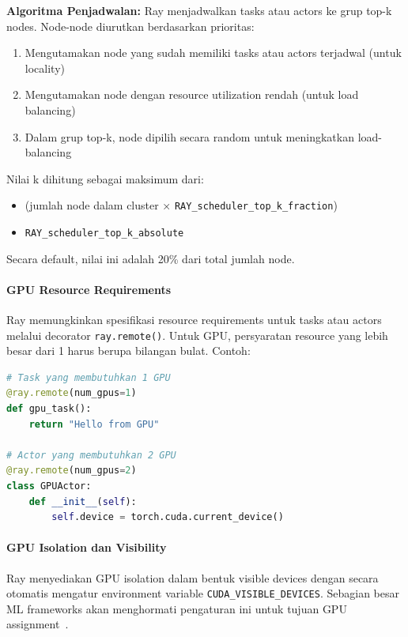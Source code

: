 \textbf{Algoritma Penjadwalan:}
Ray menjadwalkan tasks atau actors ke grup top-k nodes. Node-node diurutkan berdasarkan prioritas:
\begin{enumerate}
\item Mengutamakan node yang sudah memiliki tasks atau actors terjadwal (untuk locality)
\item Mengutamakan node dengan resource utilization rendah (untuk load balancing)
\item Dalam grup top-k, node dipilih secara random untuk meningkatkan load-balancing
\end{enumerate}

Nilai k dihitung sebagai maksimum dari:
\begin{itemize}
\item (jumlah node dalam cluster × \texttt{RAY\_scheduler\_top\_k\_fraction})
\item \texttt{RAY\_scheduler\_top\_k\_absolute}
\end{itemize}
Secara default, nilai ini adalah 20\% dari total jumlah node.

\paragraph{GPU Resource Requirements}

Ray memungkinkan spesifikasi resource requirements untuk tasks atau actors melalui decorator \texttt{ray.remote()}. Untuk GPU, persyaratan resource yang lebih besar dari 1 harus berupa bilangan bulat. Contoh:

\begin{lstlisting}[language=Python]
# Task yang membutuhkan 1 GPU
@ray.remote(num_gpus=1)
def gpu_task():
    return "Hello from GPU"

# Actor yang membutuhkan 2 GPU
@ray.remote(num_gpus=2)
class GPUActor:
    def __init__(self):
        self.device = torch.cuda.current_device()
\end{lstlisting}

\paragraph{GPU Isolation dan Visibility}

Ray menyediakan GPU isolation dalam bentuk visible devices dengan secara otomatis mengatur environment variable \texttt{CUDA\_VISIBLE\_DEVICES}. Sebagian besar ML frameworks akan menghormati pengaturan ini untuk tujuan GPU assignment~\citep{RayResources2024}.

